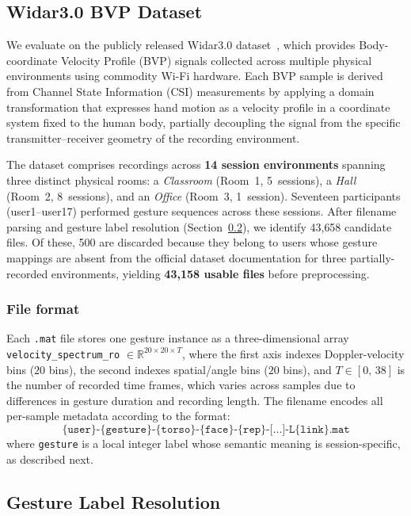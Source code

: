 \documentclass[journal]{IEEEtran}
\newcommand{\R}{\mathbb{R}}
\begin{document}
\subsection{Widar3.0 BVP Dataset}
\label{sec:dataset:overview}

We evaluate on the publicly released Widar3.0
dataset~\cite{zheng2019widar3}, which provides Body-coordinate
Velocity Profile (BVP) signals collected across multiple physical
environments using commodity Wi-Fi hardware.
Each BVP sample is derived from Channel State Information (CSI)
measurements by applying a domain transformation that expresses hand
motion as a velocity profile in a coordinate system fixed to the
human body, partially decoupling the signal from the specific
transmitter--receiver geometry of the recording environment.

The dataset comprises recordings across \textbf{14 session
environments} spanning three distinct physical rooms: a
\emph{Classroom} (Room~1, 5~sessions), a \emph{Hall} (Room~2,
8~sessions), and an \emph{Office} (Room~3, 1~session).
Seventeen participants (user1--user17) performed gesture sequences
across these sessions.
After filename parsing and gesture label resolution
(Section~\ref{sec:dataset:labels}), we identify 43{,}658 candidate
files.
Of these, 500 are discarded because they belong to users whose
gesture mappings are absent from the official dataset documentation
for three partially-recorded environments, yielding
\textbf{43{,}158 usable files} before preprocessing.

\subsubsection*{File format}
Each \texttt{.mat} file stores one gesture instance as a
three-dimensional array
\texttt{velocity\_spectrum\_ro} $\in \R^{20 \times 20 \times T}$,
where the first axis indexes Doppler-velocity bins ($20$ bins),
the second indexes spatial/angle bins ($20$ bins), and
$T \in [0,\,38]$ is the number of recorded time frames, which varies
across samples due to differences in gesture duration and recording
length.
The filename encodes all per-sample metadata according to the format:
\begin{equation*}
  \texttt{\{user\}-\{gesture\}-\{torso\}-\{face\}-\{rep\}-[\ldots]-L\{link\}.mat}
\end{equation*}
where \texttt{gesture} is a local integer label whose semantic meaning
is session-specific, as described next.

\subsection{Gesture Label Resolution}
\label{sec:dataset:labels}
\end{document}
